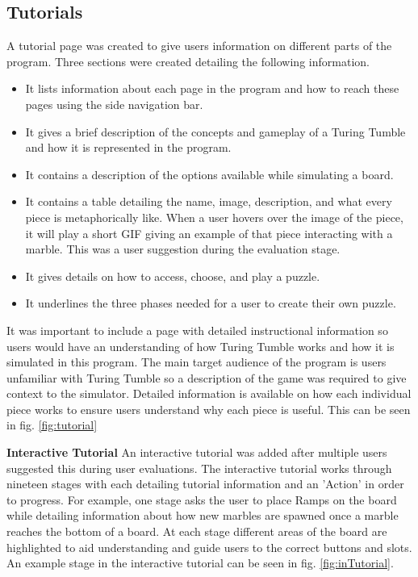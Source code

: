 \documentclass{l4proj}
\begin{document}
\subsection{Tutorials}
\label{section:tutorial}
A tutorial page was created to give users information on different parts of the program. Three sections were created detailing the following information.
\begin{itemize}
    \item It lists information about each page in the program and how to reach these pages using the side navigation bar.
    \item It gives a brief description of the concepts and gameplay of a Turing Tumble and how it is represented in the program.
    \item It contains a description of the options available while simulating a board.
    \item It contains a table detailing the name, image, description, and what every piece is metaphorically like. When a user hovers over the image of the piece, it will play a short GIF giving an example of that piece interacting with a marble. This was a user suggestion during the evaluation stage.
    \item It gives details on how to access, choose, and play a puzzle.
    \item It underlines the three phases needed for a user to create their own puzzle.
\end{itemize}

It was important to include a page with detailed instructional information so users would have an understanding of how Turing Tumble works and how it is simulated in this program. The main target audience of the program is users unfamiliar with Turing Tumble so a description of the game was required to give context to the simulator. Detailed information is available on how each individual piece works to ensure users understand why each piece is useful. This can be seen in fig. \ref{fig:tutorial}

\textbf{Interactive Tutorial}
An interactive tutorial was added after multiple users suggested this during user evaluations. The interactive tutorial works through nineteen stages with each detailing tutorial information and an 'Action' in order to progress. For example, one stage asks the user to place Ramps on the board while detailing information about how new marbles are spawned once a marble reaches the bottom of a board. At each stage different areas of the board are highlighted to aid understanding and guide users to the correct buttons and slots. An example stage in the interactive tutorial can be seen in fig. \ref{fig:inTutorial}.
\end{document}
